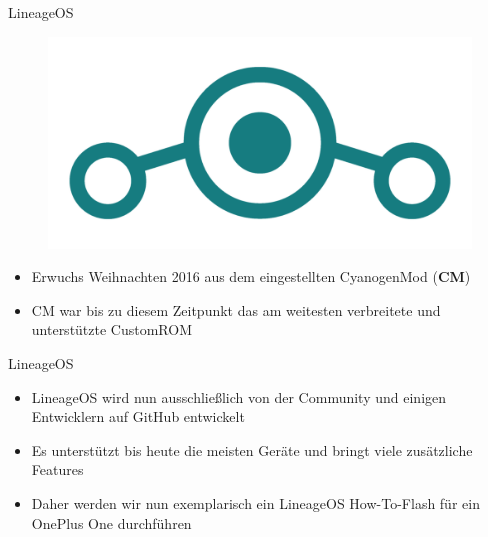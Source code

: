 \begin{frame}{LineageOS}
	\begin{figure}
		\includegraphics[scale=0.25]{resources/Lineage_OS_Logo.png}
	\end{figure}
	\begin{itemize}[<+->]
		\item Erwuchs Weihnachten 2016 aus dem eingestellten CyanogenMod (\textbf{CM})
		\item CM war bis zu diesem Zeitpunkt das am weitesten verbreitete und unterstützte CustomROM
	\end{itemize}
\end{frame}

\begin{frame}{LineageOS}
	\begin{itemize}[<+->]
		\item LineageOS wird nun ausschließlich von der Community und einigen Entwicklern auf GitHub entwickelt
		\item Es unterstützt bis heute die meisten Geräte und bringt viele zusätzliche Features
		\item Daher werden wir nun exemplarisch ein LineageOS How-To-Flash für ein OnePlus One durchführen
	\end{itemize}
\end{frame}
